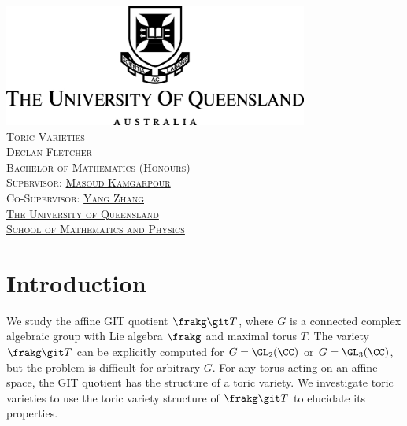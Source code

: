 \documentclass[12pt]{amsart}
\theoremstyle{plain}
\begin{document}

\begin{center}
\includegraphics[width=10cm]{../images/UQLogo.jpg} \\ 
\vspace{3cm}
{\LARGE\textsc{Toric Varieties}} \\
\vspace{0.5cm}
{\textsc{Declan Fletcher}} \\
\vspace{8cm}
{\textsc{ Bachelor of Mathematics (Honours)}} \\
\vspace{1cm}
{\textsc{Supervisor: \href{https://sites.google.com/site/masoudkomi/home}{Masoud Kamgarpour}}} \\
{\textsc{Co-Supervisor: \href{https://sites.google.com/site/yangzhang139/home}{Yang Zhang}}} \\
\vspace{1cm}
{\textsc{\href{https://www.uq.edu.au/}{The University of Queensland}}} \\
{\textsc{\href{https://smp.uq.edu.au/}{School of Mathematics and Physics}}}
\end{center}


\newpage
\tableofcontents


\newpage
{}
\section{Introduction}
We study the affine GIT quotient $\frakg \git T$, where $G$ is a connected complex algebraic group with Lie algebra $\frakg$ and maximal torus $T$.
The variety $\frakg \git T$ can be explicitly computed for $G = \GL_2(\CC)$ or $G = \GL_3(\CC)$, but the problem is difficult for arbitrary $G$.
For any torus acting on an affine space, the GIT quotient has the structure of a toric variety.
We investigate toric varieties to use the toric variety structure of $\frakg \git T$ to elucidate its properties.
\end{document}
